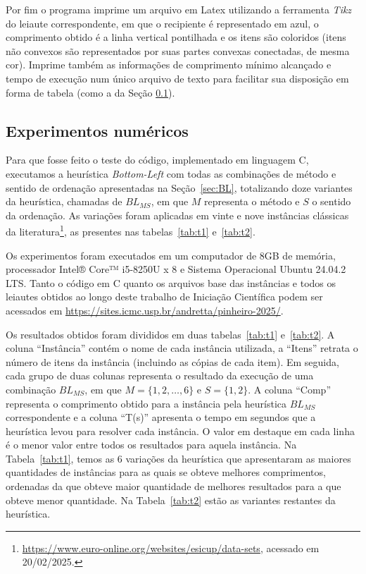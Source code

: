 \documentclass[12pt, openright, twoside, a4paper, english, brazilian]{USPSC-classe/USPSC}
\begin{document}
Por fim o programa imprime um arquivo em Latex utilizando a ferramenta {\it Tikz} do leiaute correspondente, em que o recipiente é representado em azul, o comprimento obtido é a linha vertical pontilhada e os itens são coloridos (itens não convexos são representados por suas partes convexas conectadas, de mesma cor). Imprime também as informações de comprimento mínimo alcançado e tempo de execução num único arquivo de texto para facilitar sua disposição em forma de tabela (como a da Seção \ref{sec:experimentosbl}).


\subsection{Experimentos numéricos} \label{sec:experimentosbl}


Para que fosse feito o teste do código, implementado em linguagem C, executamos a heurística {\it Bottom-Left} com todas as combinações de método e sentido de ordenação apresentadas na Seção~\ref{sec:BL}, totalizando doze variantes da heurística, chamadas de $BL_{MS}$, em que $M$ representa o método e $S$ o sentido da ordenação. As variações foram aplicadas em vinte e nove instâncias clássicas da literatura\footnote{\url{https://www.euro-online.org/websites/esicup/data-sets}, acessado em 20/02/2025.}, as presentes nas tabelas~\ref{tab:t1} e~\ref{tab:t2}.

Os experimentos foram executados em um computador de 8GB de memória, processador Intel® Core™ i5-8250U x 8 e Sistema Operacional Ubuntu 24.04.2 LTS. Tanto o código em C quanto os arquivos base das instâncias e todos os leiautes obtidos ao longo deste trabalho de Iniciação Científica podem ser acessados em \url{https://sites.icmc.usp.br/andretta/pinheiro-2025/}.


Os resultados obtidos foram divididos em duas tabelas~\ref{tab:t1} e~\ref{tab:t2}. A coluna ``Instância'' contém o nome de cada instância utilizada, a ``Itens'' retrata o número de itens da instância (incluindo as cópias de cada item). Em seguida, cada grupo de duas colunas representa o resultado da execução de uma combinação $BL_{MS}$, em que $M = \{1, 2, \dots, 6\}$ e $S = \{1, 2\}$. A coluna ``Comp'' representa o comprimento obtido para a instância pela heurística $BL_{MS}$ correspondente e a coluna ``T(s)'' apresenta o tempo em segundos que a heurística levou para resolver cada instância. O valor em destaque em cada linha é o menor valor entre todos os resultados para aquela instância. Na Tabela~\ref{tab:t1}, temos as 6 variações da heurística que apresentaram as maiores quantidades de instâncias para as quais se obteve melhores comprimentos, ordenadas da que obteve maior quantidade de melhores resultados para a que obteve menor quantidade. Na Tabela~\ref{tab:t2} estão as variantes restantes da heurística.
\end{document}
